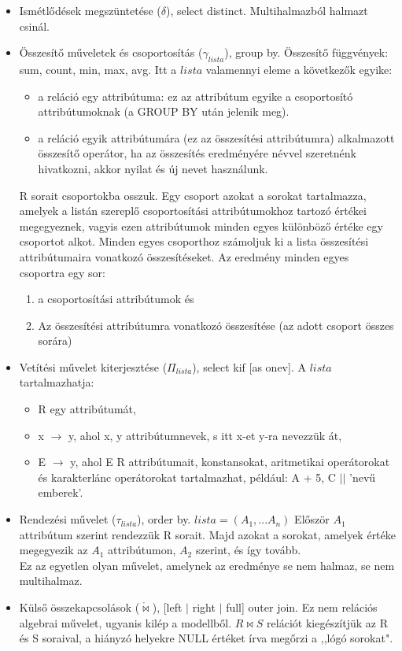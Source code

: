 \documentclass[margin=0px]{article}
\begin{document}
\begin{itemize}
    \item Ismétlődések megszüntetése ($\delta$), select distinct. Multihalmazból halmazt csinál.
    \item Összesítő műveletek és csoportosítás ($\gamma_{lista}$), group by. Összesítő függvények: sum, count, min, max, avg. Itt a $lista$ valamennyi eleme a következők egyike:
          \begin{itemize}
              \item a reláció egy attribútuma: ez az attribútum egyike a csoportosító attribútumoknak (a GROUP BY után jelenik meg).
              \item a reláció egyik attribútumára (ez az összesítési attribútumra) alkalmazott összesítő operátor, ha az összesítés eredményére névvel szeretnénk hivatkozni, akkor nyilat és új nevet használunk.
          \end{itemize}
          R sorait csoportokba osszuk. Egy csoport azokat a sorokat tartalmazza, amelyek a listán szereplő
          csoportosítási attribútumokhoz tartozó értékei megegyeznek, vagyis ezen attribútumok minden egyes különböző értéke egy csoportot alkot. Minden egyes csoporthoz számoljuk ki a lista összesítési attribútumaira vonatkozó összesítéseket. Az eredmény minden egyes csoportra egy sor:
          \begin{enumerate}
              \item a csoportosítási attribútumok és
              \item Az összesítési attribútumra vonatkozó összesítése	(az adott csoport összes sorára)
          \end{enumerate}
    \item Vetítési művelet kiterjesztése ($\Pi_{lista}$), select kif [as onev]. A $lista$ tartalmazhatja:
          \begin{itemize}
              \item R egy attribútumát,
              \item x $\to$ y, ahol x, y attribútumnevek, s itt x-et y-ra nevezzük át,
              \item E $\to$ y, ahol E R attribútumait, konstansokat, aritmetikai operátorokat és karakterlánc operátorokat tartalmazhat, például: A + 5, C $||$ 'nevű emberek'.
          \end{itemize}
    \item Rendezési művelet ($\tau_{lista}$), order by. $lista = (A_1,...A_n)$ Először $A_1$ attribútum szerint rendezzük R sorait. Majd azokat a sorokat, amelyek értéke megegyezik az $A_1$ attribútumon, $A_2$ szerint, és így tovább. \\
          Ez az egyetlen olyan művelet, amelynek az eredménye se nem halmaz, se nem multihalmaz.
    \item Külső összekapcsolások ($\mathring{\bowtie}$), [left $|$ right $|$ full] outer join. Ez nem relációs algebrai művelet, ugyanis kilép a modellből. $R \bowtie S$ relációt kiegészítjük az R és S soraival, a hiányzó helyekre NULL értéket írva megőrzi a ,,lógó sorokat".
\end{itemize}
\end{document}
